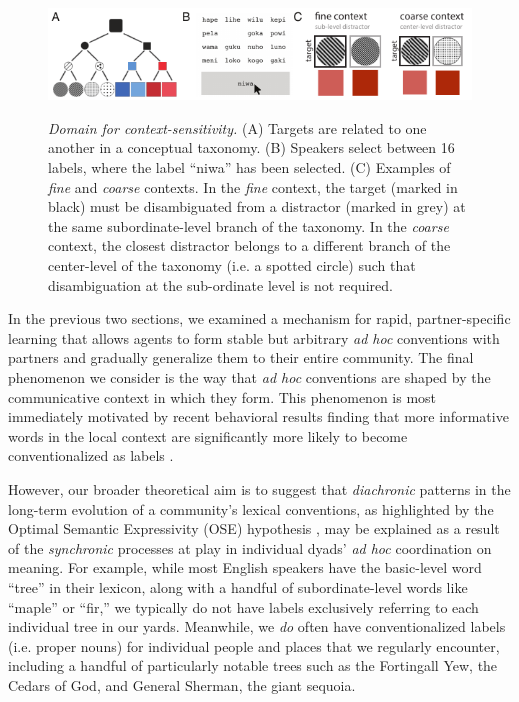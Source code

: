 
\begin{figure}[t]
\begin{center}
{\includegraphics[scale=1.8]{./figures/Sec2-design.pdf}}
{\caption{{\emph{Domain for context-sensitivity.} (A) Targets are related to one another in a conceptual taxonomy. (B) Speakers select between 16 labels, where the label ``niwa'' has been selected. (C) Examples of \emph{fine} and \emph{coarse} contexts. In the \emph{fine} context, the target (marked in black) must be disambiguated from a distractor (marked in grey) at the same subordinate-level branch of the taxonomy.  In the \emph{coarse} context, the closest distractor belongs to a different branch of the center-level of the taxonomy (i.e. a spotted circle) such that disambiguation at the sub-ordinate level is not required. \label{fig:context_design}}}}
\vspace{-2ex}
\end{center}
\end{figure}



In the previous two sections, we examined a mechanism for rapid, partner-specific learning that allows agents to form stable but arbitrary \emph{ad hoc} conventions with partners and gradually generalize them to their entire community. 
The final phenomenon we consider is the way that \emph{ad hoc} conventions are shaped by the communicative context in which they form.
This phenomenon is most immediately motivated by recent behavioral results finding that more informative words in the local context are significantly more likely to become conventionalized as labels \cite{hawkins2020characterizing}.

However, our broader theoretical aim is to suggest that \emph{diachronic} patterns in the long-term evolution of a community's lexical conventions, as highlighted by the Optimal Semantic Expressivity (OSE) hypothesis \cite{frankblogpost}, may be explained as a result of the \emph{synchronic} processes at play in individual dyads' \emph{ad hoc} coordination on meaning.
For example, while most English speakers have the basic-level word ``tree'' in their lexicon, along with a handful of subordinate-level words like ``maple'' or ``fir,'' we typically do not have labels exclusively referring to each individual tree in our yards.
Meanwhile, we \emph{do} often have conventionalized labels (i.e. proper nouns) for individual people and places that we regularly encounter, including a handful of particularly notable trees such as the Fortingall Yew, the Cedars of God, and General Sherman, the giant sequoia.

